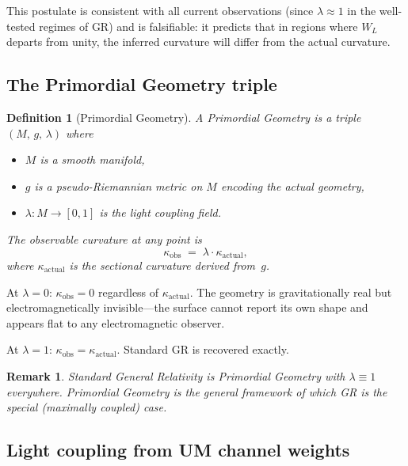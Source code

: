 \documentclass[prd,twocolumn,preprintnumbers,amsmath,amssymb]{revtex4-2}
\newtheorem{definition}{Definition}
\newtheorem{remark}{Remark}
\newcommand{\WL}{W_{L}}
\newcommand{\kact}{\kappa_{\mathrm{actual}}}
\newcommand{\kobs}{\kappa_{\mathrm{obs}}}
\begin{document}
This postulate is consistent with all current observations (since $\lambda
\approx 1$ in the well-tested regimes of GR) and is falsifiable: it predicts
that in regions where $\WL$ departs from unity, the inferred curvature will
differ from the actual curvature.

\subsection{The Primordial Geometry triple}

\begin{definition}[Primordial Geometry]
A \emph{Primordial Geometry} is a triple $(M,\,g,\,\lambda)$ where
\begin{itemize}
  \item $M$ is a smooth manifold,
  \item $g$ is a pseudo-Riemannian metric on $M$ encoding the \emph{actual}
        geometry,
  \item $\lambda: M\to[0,1]$ is the \emph{light coupling field}.
\end{itemize}
The \emph{observable curvature} at any point is
\begin{equation}
  \kobs \;=\; \lambda\cdot\kact,
  \label{eq:kobs}
\end{equation}
where $\kact$ is the sectional curvature derived from~$g$.
\end{definition}

At $\lambda=0$: $\kobs = 0$ regardless of $\kact$.  The geometry is
gravitationally real but electromagnetically invisible---the surface cannot
report its own shape and appears flat to any electromagnetic observer.

At $\lambda=1$: $\kobs = \kact$.  Standard GR is recovered exactly.

\begin{remark}
Standard General Relativity is Primordial Geometry with $\lambda \equiv 1$
everywhere.  Primordial Geometry is the general framework of which GR is the
special (maximally coupled) case.
\end{remark}

\subsection{Light coupling from UM channel weights}
\end{document}
